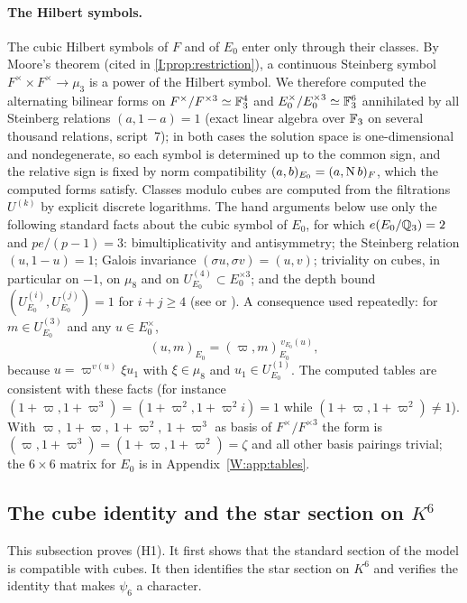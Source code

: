 \paragraph{The Hilbert symbols.}
The cubic Hilbert symbols of $F$ and of $E_0$ enter only through their
classes.  By Moore's theorem (cited in \cref{I:prop:restriction}), a
continuous Steinberg symbol $F^\times\times F^\times\to\mu_3$ is a power of
the Hilbert symbol.  We therefore computed the alternating bilinear
forms on $F^\times/F^{\times3}\simeq\mathbb F_3^4$ and $E_0^\times/E_0^{\times3}\simeq\mathbb F_3^6$
annihilated by all Steinberg relations $(a,1-a)=1$ (exact linear
algebra over $\mathbb F_3$ on several thousand relations, script~7); in both
cases the solution space is one-dimensional and nondegenerate, so each
symbol is determined up to the common sign, and the relative sign is
fixed by norm compatibility $(a,b)_{E_0}=(a,\operatorname N b)_F$, which the
computed forms satisfy.  Classes modulo cubes are computed from the
filtrations $U^{(k)}$ by explicit discrete logarithms.  The hand
arguments below use only the following standard facts about the cubic
symbol of $E_0$, for which $e(E_0/\mathbb Q_3)=2$ and $pe/(p-1)=3$:
bimultiplicativity and antisymmetry; the Steinberg relation
$(u,1-u)=1$; Galois invariance $(\sigma u,\sigma v)=(u,v)$; triviality
on cubes, in particular on $-1$, on $\mu_8$ and on
$U^{(4)}_{E_0}\subset E_0^{\times3}$; and the depth bound
$(U^{(i)}_{E_0},U^{(j)}_{E_0})=1$ for $i+j\ge4$ (see \cite[Ch.~IV]{FV02} or
\cite[Ch.~XIV]{Ser79}).  A consequence used repeatedly: for $m\in U^{(3)}_{E_0}$
and any $u\in E_0^\times$,
\begin{equation}\label{W:eq:level0}
 (u,m)_{E_0}=(\varpi,m)_{E_0}^{\,v_{E_0}(u)},
\end{equation}
because $u=\varpi^{v(u)}\xi u_1$ with $\xi\in\mu_8$ and $u_1\in U^{(1)}_{E_0}$.
The computed tables are consistent with these facts (for instance
$(1+\varpi,1+\varpi^3)=(1+\varpi^2,1+\varpi^2i)=1$ while
$(1+\varpi,1+\varpi^2)\ne1$).  With
$\varpi,\ 1+\varpi,\ 1+\varpi^2,\ 1+\varpi^3$ as basis of $F^\times/F^{\times3}$ the
form is $(\varpi,1+\varpi^3)=(1+\varpi,1+\varpi^2)=\zeta$ and all other basis
pairings trivial; the $6\times6$ matrix for $E_0$ is in
Appendix~\ref{W:app:tables}.

\subsection{The cube identity and the star section on $K^6$}
This subsection proves (H1). It first shows that the standard section of the model is compatible with cubes. It then identifies the star section on $K^6$ and verifies the identity that makes $\psi_6$ a character.

